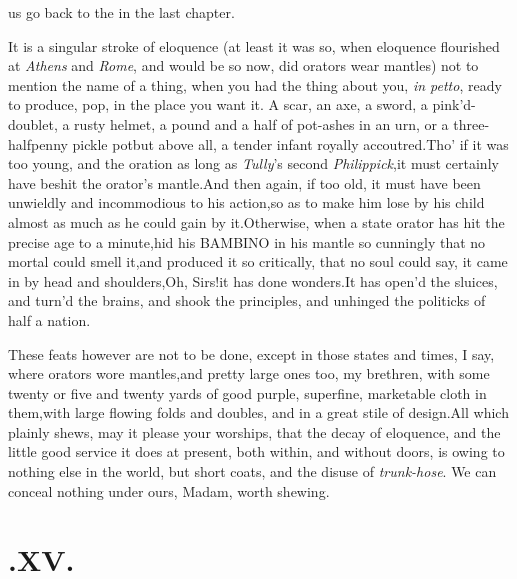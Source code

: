 \documentclass{article}
\begin{document}
 us go back to the
\astvi\break\tsh in the last chapter.

It is a singular stroke of eloquence (at least it was so, when
eloquence flourished at \textit{Athens} and \textit{Rome}, and would be
so now, did orators wear mantles) not to mention the name of a
thing, when you had the thing about you, \textit{in petto}, ready to
produce, pop, in the place you want it. A scar, an axe, a sword, a
pink’d-\break doublet, a rusty helmet, a pound and a half of
pot-ashes in an urn, or a three-halfpenny pickle pot\tsk but
above all, a tender infant royally accoutred.\tsk Tho’ if
it was too young, and the oration as long as \textit{Tully}’s
second \textit{Philippick},\tsk it must certainly have beshit the
orator’s
mantle.\tsk And then again, if too old,\break
\tsk it must have been unwieldly and in\-commodious to his action,\tsk so as
to make him lose by his child almost as much as he could
gain by it.\tsk Otherwise, when a state orator has hit the
precise age to a minute,\tsh hid his BAMBINO in his mantle
so cunningly that no mortal could smell it,\tsk and produced
it so critically, that no soul could say, it came in by head
and shoulders,\tsk Oh, Sirs!\@ it has done wonders.\tsh It
has open’d the sluices, and turn’d the brains, and shook the
principles, and unhinged the politicks of half a
nation.

These feats however are not to be done, except in those states
and times, I say, where orators wore mantles,\tsk and pretty
large ones too, my brethren, with some twenty or five and twenty
yards of good purple, superfine, marketable cloth in\break
them,\tsh with large flowing folds and doubles, and in a
great stile of design.\break\tsh All which plainly shews,
may it please your worships, that the decay of eloquence,
and the little good service it does at present, both within,
and without doors, is owing to nothing else in the world,
but short coats, and the disuse of \textit{trunk-hose}.\tsh
We can conceal nothing under ours, Madam, worth shewing.

\baselineskip 

\section{.\quad  XV.}

\baselineskip 
\end{document}
